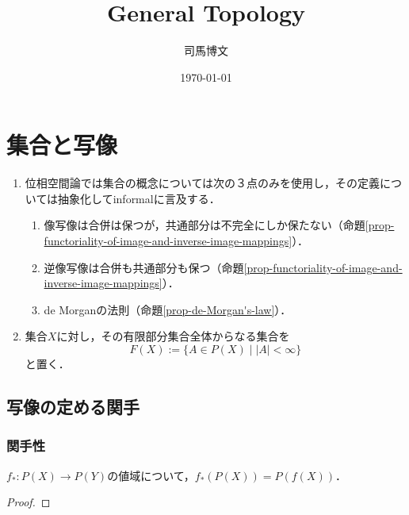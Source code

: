\documentclass[uplatex,dvipdfmx]{jsreport}
\title{General Topology}
\author{司馬博文}
\date{\today}
\begin{document}
\tableofcontents

\chapter{集合と写像}

\begin{notation}\mbox{}
    \begin{enumerate}
        \item 位相空間論では集合の概念については次の３点のみを使用し，その定義については抽象化してinformalに言及する．
        \begin{enumerate}[(1)]
            \item 像写像は合併は保つが，共通部分は不完全にしか保たない（命題\ref{prop-functoriality-of-image-and-inverse-image-mappings}）．
            \item 逆像写像は合併も共通部分も保つ（命題\ref{prop-functoriality-of-image-and-inverse-image-mappings}）．
            \item de Morganの法則（命題\ref{prop-de-Morgan's-law}）．
        \end{enumerate}
        \item 集合$X$に対し，その有限部分集合全体からなる集合を
        \[ F(X):=\{A\in P(X)\mid|A|<\infty\} \]
        と置く．
    \end{enumerate}
\end{notation}

\section{写像の定める関手}

\subsection{関手性}


\begin{problem}[A2.5.3]
    $f_*:P(X)\to P(Y)$の値域について，$f_*(P(X))=P(f(X))$．
\end{problem}
\begin{proof}
    
\end{proof}
\end{document}
